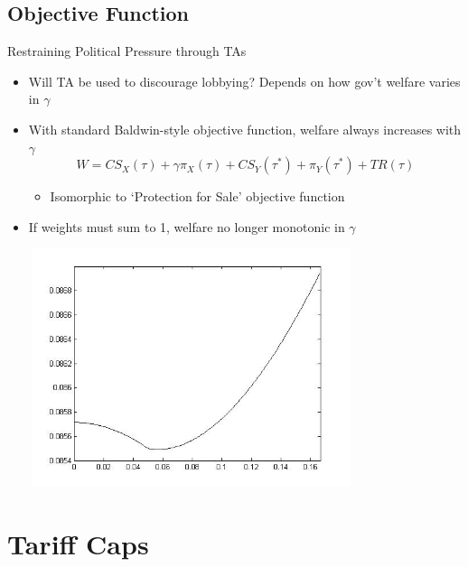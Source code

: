 \documentclass{beamer}
\newcommand{\ga}{\gamma}
\begin{document}
\subsection{Objective Function}
\begin{frame}{Restraining Political Pressure through TAs}
\pause
\begin{itemize}[<+->]
	\item Will TA be used to discourage lobbying? Depends on how gov't welfare varies in $\ga$
	\item With standard Baldwin-style objective function, welfare always increases with $\ga$
\[
  W = \mathit{CS}_X(\tau) + \ga \pi_X(\tau) + \mathit{CS}_Y(\tau^*) + \pi_Y(\tau^*) + \mathit{TR}(\tau)
\] 

	\begin{itemize}
		\item Isomorphic to `Protection for Sale' objective function
	\end{itemize}

	\item If weights must sum to 1, welfare no longer monotonic in $\ga$
\end{itemize}
\end{frame}

\begin{frame}
\includegraphics[height=2.75in, width=4.25in]{weight.jpg}
\end{frame}


\section{Tariff Caps}
\end{document}

